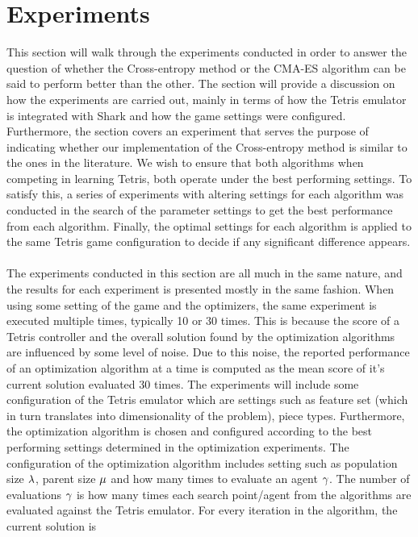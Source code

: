 \section{Experiments}
This section will walk through the experiments conducted in order to answer the question 
of whether the Cross-entropy method or the CMA-ES algorithm can be said to perform better
than the other. The section will provide a discussion on how the experiments are carried out, mainly
in terms of how the Tetris emulator is integrated with Shark and how the game settings were configured.
Furthermore, the section covers an experiment that serves the purpose of indicating whether our implementation
of the Cross-entropy method is similar to the ones in the literature. 
We wish to ensure that both algorithms when competing in learning Tetris, both operate under the 
best performing settings. To satisfy this, a series of experiments with altering settings for each 
algorithm was conducted in the search of the parameter settings to get the best performance from 
each algorithm. Finally, the optimal settings for each algorithm is applied to
the same Tetris game configuration to decide if any significant difference appears.\\
\\
The experiments conducted in this section are all much in the same nature, and the 
results for each experiment is presented mostly in the same fashion. When using some setting 
of the game and the optimizers, the same experiment is executed multiple times, typically 
10 or 30 times. This is because the score of a Tetris controller and the overall 
solution found by the optimization algorithms are influenced by some level of noise.
Due to this noise, the reported performance of an optimization algorithm at a time
is computed as the mean score of it's current solution evaluated 30 times.
The experiments will include some configuration of the Tetris emulator which are settings
such as feature set (which in turn translates into dimensionality of the problem),
piece types. Furthermore, the optimization algorithm is chosen and configured according to
the best performing settings determined in the optimization experiments. The
configuration of the optimization algorithm includes setting such as population size
$\lambda$, parent size $\mu$ and how many times
to evaluate an agent $\gamma$. The number of evaluations $\gamma$
is how many times each search point/agent from the algorithms are evaluated against the 
Tetris emulator. For every iteration in the algorithm, the current solution is 
